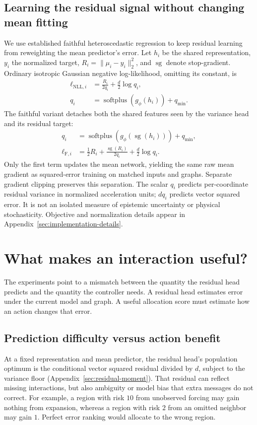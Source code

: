 \subsection{Learning the residual signal without changing mean fitting}
We use established faithful heteroscedastic regression \citep{stirn2023} to keep residual learning from reweighting the mean predictor's error. Let $h_i$ be the shared representation, $y_i$ the normalized target, $R_i=\|\mu_i-y_i\|_2^2$, and $\operatorname{sg}$ denote stop-gradient. Ordinary isotropic Gaussian negative log-likelihood, omitting its constant, is
\begin{align}
 \ell_{\mathrm{NLL},i}&=\frac{R_i}{2q_i}+\frac d2\log q_i,\nonumber\\
 q_i&=\operatorname{softplus}(g_\phi(h_i))+q_{\min}.
 \label{eq:nll}
\end{align}
The faithful variant detaches both the shared features seen by the variance head and its residual target:
\begin{align}
 q_i&=\operatorname{softplus}(g_\phi(\operatorname{sg}(h_i)))+q_{\min},\nonumber\\
 \ell_{\mathrm F,i}&=\tfrac12R_i+
 \frac{\operatorname{sg}(R_i)}{2q_i}+\frac d2\log q_i.
 \label{eq:faithful}
\end{align}
Only the first term updates the mean network, yielding the same raw mean gradient as squared-error training on matched inputs and graphs. Separate gradient clipping preserves this separation. The scalar $q_i$ predicts per-coordinate residual variance in normalized acceleration units; $dq_i$ predicts vector squared error. It is not an isolated measure of epistemic uncertainty or physical stochasticity. Objective and normalization details appear in Appendix~\ref{sec:implementation-details}.


\section{What makes an interaction useful?}
The experiments point to a mismatch between the quantity the residual head predicts and the quantity the controller needs. A residual head estimates error under the current model and graph. A useful allocation score must estimate how an action changes that error.

\subsection{Prediction difficulty versus action benefit}
At a fixed representation and mean predictor, the residual head's population optimum is the conditional vector squared residual divided by $d$, subject to the variance floor (Appendix~\ref{sec:residual-moment}). That residual can reflect missing interactions, but also ambiguity or model bias that extra messages do not correct. For example, a region with risk $10$ from unobserved forcing may gain nothing from expansion, whereas a region with risk $2$ from an omitted neighbor may gain $1$. Perfect error ranking would allocate to the wrong region.

